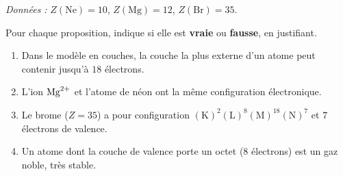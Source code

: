 \documentclass[11pt,a4paper]{article}
\begin{document}
\begin{exo}
\textit{Données :} $Z(\mathrm{Ne})=10$, $Z(\mathrm{Mg})=12$, $Z(\mathrm{Br})=35$.

\smallskip
Pour chaque proposition, indique si elle est \textbf{vraie} ou \textbf{fausse}, en justifiant.
\begin{enumerate}[label=\alph*)]
  \item Dans le modèle en couches, la couche la plus externe d'un atome peut contenir jusqu'à $18$
        électrons.
  \item L'ion $\ce{Mg^{2+}}$ et l'atome de néon ont la même configuration électronique.
  \item Le brome ($Z=35$) a pour configuration $(\mathrm{K})^2(\mathrm{L})^8(\mathrm{M})^{18}
        (\mathrm{N})^7$ et $7$ électrons de valence.
  \item Un atome dont la couche de valence porte un octet ($8$ électrons) est un gaz noble, très stable.
\end{enumerate}
\end{exo}
\end{document}
